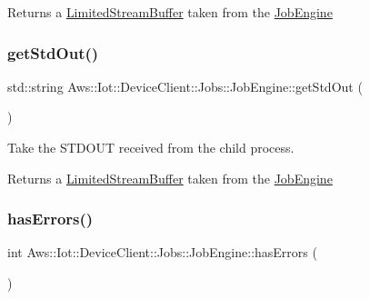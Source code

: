 \begin{DoxyReturn}{Returns}
a \hyperlink{class_aws_1_1_iot_1_1_device_client_1_1_jobs_1_1_limited_stream_buffer}{Limited\+Stream\+Buffer} taken from the \hyperlink{class_aws_1_1_iot_1_1_device_client_1_1_jobs_1_1_job_engine}{Job\+Engine} 
\end{DoxyReturn}
\mbox{\label{class_aws_1_1_iot_1_1_device_client_1_1_jobs_1_1_job_engine_affcb240c8fd6c1fe197997131929c20e}} 
\subsubsection{\texorpdfstring{get\+Std\+Out()}{getStdOut()}}
{\footnotesize\ttfamily std\+::string Aws\+::\+Iot\+::\+Device\+Client\+::\+Jobs\+::\+Job\+Engine\+::get\+Std\+Out (\begin{DoxyParamCaption}{ }\end{DoxyParamCaption})\hspace{0.3cm}{\ttfamily [inline]}}



Take the S\+T\+D\+O\+UT received from the child process. 

\begin{DoxyReturn}{Returns}
a \hyperlink{class_aws_1_1_iot_1_1_device_client_1_1_jobs_1_1_limited_stream_buffer}{Limited\+Stream\+Buffer} taken from the \hyperlink{class_aws_1_1_iot_1_1_device_client_1_1_jobs_1_1_job_engine}{Job\+Engine} 
\end{DoxyReturn}
\mbox{\label{class_aws_1_1_iot_1_1_device_client_1_1_jobs_1_1_job_engine_abcc11a86226e74648e3a5395ae180171}} 
\subsubsection{\texorpdfstring{has\+Errors()}{hasErrors()}}
{\footnotesize\ttfamily int Aws\+::\+Iot\+::\+Device\+Client\+::\+Jobs\+::\+Job\+Engine\+::has\+Errors (\begin{DoxyParamCaption}{ }\end{DoxyParamCaption})\hspace{0.3cm}{\ttfamily [inline]}}



